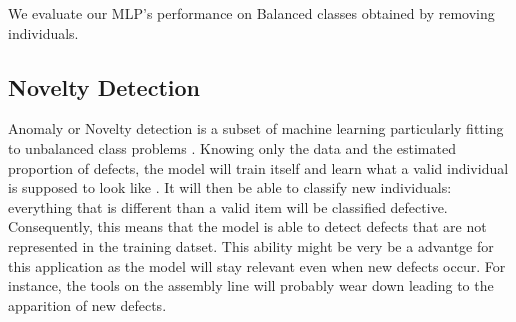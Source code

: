 
We evaluate our MLP's performance on Balanced classes obtained by removing individuals.



\subsection{Novelty Detection}
Anomaly or Novelty detection is a subset of machine learning particularly fitting to unbalanced class problems \cite{novel_scikit}. Knowing only the data and the estimated proportion of defects, the model will train itself and learn what a valid individual is supposed to look like \cite{novel_yt}. It will then be able to classify new individuals: everything that is different than a valid item will be classified defective. Consequently, this means that the model is able to detect defects that are not represented in the training datset. This ability might be very be a advantge for this application as the model will stay relevant even when new defects occur. For instance, the tools on the assembly line will probably wear down leading to the apparition of new defects.